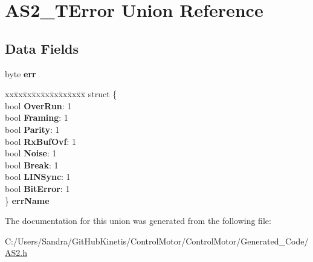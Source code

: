 \hypertarget{union_a_s2___t_error}{}\section{A\+S2\+\_\+\+T\+Error Union Reference}
\label{union_a_s2___t_error}
\subsection*{Data Fields}
\begin{DoxyCompactItemize}
\item 
byte {\bfseries err}\hypertarget{union_a_s2___t_error_a86b9b5a606ee099fb07e6ddf42486b03}{}\label{union_a_s2___t_error_a86b9b5a606ee099fb07e6ddf42486b03}

\item 
\begin{tabbing}
xx\=xx\=xx\=xx\=xx\=xx\=xx\=xx\=xx\=\kill
struct \{\\
\>bool {\bfseries OverRun}: 1\\
\>bool {\bfseries Framing}: 1\\
\>bool {\bfseries Parity}: 1\\
\>bool {\bfseries RxBufOvf}: 1\\
\>bool {\bfseries Noise}: 1\\
\>bool {\bfseries Break}: 1\\
\>bool {\bfseries LINSync}: 1\\
\>bool {\bfseries BitError}: 1\\
\} {\bfseries errName}\hypertarget{union_a_s2___t_error_a47b5bfc66a5566fd42359e9aa618b5a5}{}\label{union_a_s2___t_error_a47b5bfc66a5566fd42359e9aa618b5a5}
\\

\end{tabbing}\end{DoxyCompactItemize}


The documentation for this union was generated from the following file\+:\begin{DoxyCompactItemize}
\item 
C\+:/\+Users/\+Sandra/\+Git\+Hub\+Kinetis/\+Control\+Motor/\+Control\+Motor/\+Generated\+\_\+\+Code/\hyperlink{_a_s2_8h}{A\+S2.\+h}\end{DoxyCompactItemize}
